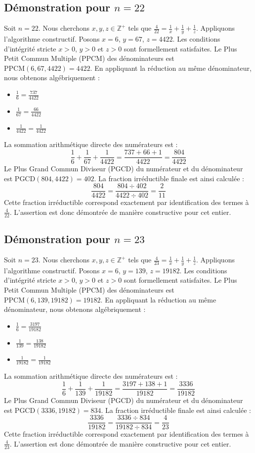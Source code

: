 \documentclass[11pt,a4paper]{article}
\begin{document}
\subsection{Démonstration pour $n = 22$}
Soit $n = 22$. Nous cherchons $x, y, z \in \mathbb{Z}^{+}$ tels que $\frac{4}{22} = \frac{1}{x} + \frac{1}{y} + \frac{1}{z}$.
Appliquons l'algorithme constructif. Posons $x = 6$, $y = 67$, $z = 4422$.
Les conditions d'intégrité stricte $x > 0$, $y > 0$ et $z > 0$ sont formellement satisfaites.
Le Plus Petit Commun Multiple (PPCM) des dénominateurs est $\text{PPCM}(6, 67, 4422) = 4422$.
En appliquant la réduction au même dénominateur, nous obtenons algébriquement :
\begin{itemize}
    \item $\frac{1}{6} = \frac{737}{4422}$
    \item $\frac{1}{67} = \frac{66}{4422}$
    \item $\frac{1}{4422} = \frac{1}{4422}$
\end{itemize}
La sommation arithmétique directe des numérateurs est :
$$ \frac{1}{6} + \frac{1}{67} + \frac{1}{4422} = \frac{737 + 66 + 1}{4422} = \frac{804}{4422} $$
Le Plus Grand Commun Diviseur (PGCD) du numérateur et du dénominateur est $\text{PGCD}(804, 4422) = 402$.
La fraction irréductible finale est ainsi calculée :
$$ \frac{804}{4422} = \frac{804 \div 402}{4422 \div 402} = \frac{2}{11} $$
Cette fraction irréductible correspond exactement par identification des termes à $\frac{4}{22}$. L'assertion est donc démontrée de manière constructive pour cet entier.

\subsection{Démonstration pour $n = 23$}
Soit $n = 23$. Nous cherchons $x, y, z \in \mathbb{Z}^{+}$ tels que $\frac{4}{23} = \frac{1}{x} + \frac{1}{y} + \frac{1}{z}$.
Appliquons l'algorithme constructif. Posons $x = 6$, $y = 139$, $z = 19182$.
Les conditions d'intégrité stricte $x > 0$, $y > 0$ et $z > 0$ sont formellement satisfaites.
Le Plus Petit Commun Multiple (PPCM) des dénominateurs est $\text{PPCM}(6, 139, 19182) = 19182$.
En appliquant la réduction au même dénominateur, nous obtenons algébriquement :
\begin{itemize}
    \item $\frac{1}{6} = \frac{3197}{19182}$
    \item $\frac{1}{139} = \frac{138}{19182}$
    \item $\frac{1}{19182} = \frac{1}{19182}$
\end{itemize}
La sommation arithmétique directe des numérateurs est :
$$ \frac{1}{6} + \frac{1}{139} + \frac{1}{19182} = \frac{3197 + 138 + 1}{19182} = \frac{3336}{19182} $$
Le Plus Grand Commun Diviseur (PGCD) du numérateur et du dénominateur est $\text{PGCD}(3336, 19182) = 834$.
La fraction irréductible finale est ainsi calculée :
$$ \frac{3336}{19182} = \frac{3336 \div 834}{19182 \div 834} = \frac{4}{23} $$
Cette fraction irréductible correspond exactement par identification des termes à $\frac{4}{23}$. L'assertion est donc démontrée de manière constructive pour cet entier.
\end{document}
